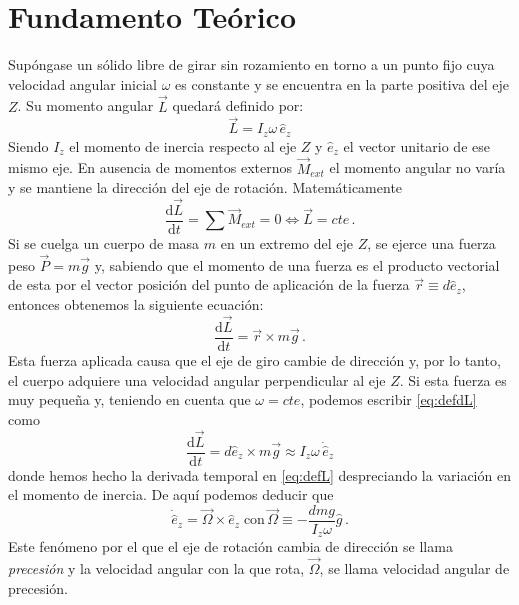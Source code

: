 \documentclass[a4paper]{article}
\begin{document}
\section{Fundamento Teórico} \label{sec:fundamento}
Supóngase un sólido libre de girar sin rozamiento en torno a un punto fijo cuya velocidad angular inicial $\omega$ es constante y se encuentra en la parte positiva del eje $Z$. Su momento angular $\vec{L}$ quedará definido por:
\begin{equation}
\label{eq:defL}
\vec{L}=I_z \omega\, \hat{e}_{z}
\end{equation}
Siendo $I_z$ el momento de inercia respecto al eje $Z$ y $\hat{e}_{z}$ el vector unitario de ese mismo eje. En ausencia de momentos externos $\vec{M}_{ext}$	el momento angular no varía y se mantiene la dirección del eje de rotación. Matemáticamente
\begin{equation}
\frac{\mathrm{d}\vec{L}}{\mathrm{d}t}=\sum \vec{M}_{ext} =0\Leftrightarrow\vec{L}=cte\,.
\end{equation}
Si se cuelga un cuerpo de masa $m$ en un extremo del eje $Z$, se ejerce una fuerza peso $\vec{P}=m\vec{g}$ y, sabiendo que el momento de una fuerza es el producto vectorial de esta por el vector posición del punto de aplicación de la fuerza $\vec{r}\equiv d\hat{e}_z$, entonces obtenemos la siguiente ecuación: 
\begin{equation}
\label{eq:defdL}
\frac{\mathrm{d}\vec{L}}{\mathrm{d}t}=\vec{r}\times m\vec{g}\,.
\end{equation}
Esta fuerza aplicada causa que el eje de giro cambie de dirección y, por lo tanto, el cuerpo adquiere una velocidad angular perpendicular al eje $Z$. Si esta fuerza es muy pequeña y, teniendo en cuenta que $\omega=cte$, podemos escribir \eqref{eq:defdL} como 
\begin{equation}
\frac{\mathrm{d}\vec{L}}{\mathrm{d}t}=d\hat{e}_z\times m\vec{g}\approx I_z \omega\, \dot{\hat{e}}_{z}
\end{equation}
donde hemos hecho la derivada temporal en \eqref{eq:defL} despreciando la variación en el momento de inercia. De aquí podemos deducir que 
\begin{equation}
\label{eq:defOmega}
\dot{\hat{e}}_{z}=\vec{\Omega}\times \hat{e}_z\;\text{con}\,\vec{\Omega}\equiv -\frac{dmg}{I_z\omega}\hat{g}\,.
\end{equation}
Este fenómeno por el que el eje de rotación cambia de dirección se llama \textit{precesión} y la velocidad angular con la que rota, $\vec{\Omega}$, se llama velocidad angular de precesión.
\end{document}
